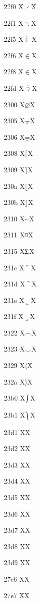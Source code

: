 \documentclass[11pt]{article}
\begin{document}
22f0 X{\ensuremath{\iddots}}X

22f1 X{\ensuremath{\ddots}}X

22f5 X{\ensuremath{\dot{\in}}}X

22f6 X{\ensuremath{\overline{\in}}}X

22f8 X{\ensuremath{\underline{\in}}}X

22fd X{\ensuremath{\overline{\ni}}}X

2300 X{\ensuremath{\diameter}}X

2305 X{\ensuremath{\barwedge}}X

2306 X{\ensuremath{\doublebarwedge}}X

2308 X{\ensuremath{\lceil}}X

2309 X{\ensuremath{\rceil}}X

230a X{\ensuremath{\lfloor}}X

230b X{\ensuremath{\rfloor}}X

2310 X{\ensuremath{\invneg}}X

2311 X{\ensuremath{\wasylozenge}}X

2315 X{\ensuremath{\recorder}}X

231c X{\ensuremath{\ulcorner}}X

231d X{\ensuremath{\urcorner}}X

231e X{\ensuremath{\llcorner}}X

231f X{\ensuremath{\lrcorner}}X

2322 X{\ensuremath{\frown}}X

2323 X{\ensuremath{\smile}}X

2329 X{\ensuremath{\langle}}X

232a X{\ensuremath{\rangle}}X

23b0 X{\ensuremath{\left\lmoustache\right.}}X

23b1 X{\ensuremath{\left\rmoustache\right.}}X

23d1 X{\metra{\b}}X

23d2 X{\metra{\mb}}X

23d3 X{\metra{\bm}}X

23d4 X{\metra{\mbb}}X

23d5 X{\metra{\bbm}}X

23d6 X{\metra{\bb}}X

23d7 X{\metra{\tsbm}}X

23d8 X{\metra{\tsmm}}X

23d9 X{\metra{\ps}}X

27e6 X{\textlbrackdbl}X

27e7 X{\textrbrackdbl}X
\end{document}
